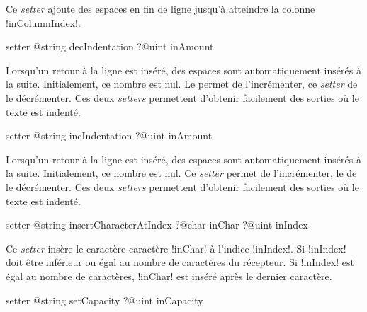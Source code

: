 Ce \emph{setter} ajoute des espaces en fin de ligne jusqu'à atteindre la colonne \ggst!inColumnIndex!.





\begin{galgas3box}
setter @string decIndentation ?@uint inAmount
\end{galgas3box}

Lorsqu'un retour à la ligne est inséré, des espaces sont automatiquement insérés à la suite. Initialement, ce nombre est nul. Le  permet de l'incrémenter, ce \emph{setter} de le décrémenter. Ces deux \emph{setters} permettent d'obtenir facilement des sorties où le texte est indenté.






\begin{galgas3box}
setter @string incIndentation ?@uint inAmount
\end{galgas3box}

Lorsqu'un retour à la ligne est inséré, des espaces sont automatiquement insérés à la suite. Initialement, ce nombre est nul. Ce \emph{setter} permet de l'incrémenter, le  de le décrémenter. Ces deux \emph{setters} permettent d'obtenir facilement des sorties où le texte est indenté.









\begin{galgas3box}
setter @string insertCharacterAtIndex
   ?@char inChar
   ?@uint inIndex
\end{galgas3box}


Ce \emph{setter} insère le caractère caractère \ggst!inChar! à l'indice \ggst!inIndex!. Si \ggst!inIndex! doit être inférieur ou égal au nombre de caractères du récepteur. Si \ggst!inIndex! est égal au nombre de caractères, \ggst!inChar! est inséré après le dernier caractère.









\begin{galgas3box}
setter @string setCapacity ?@uint inCapacity
\end{galgas3box}


